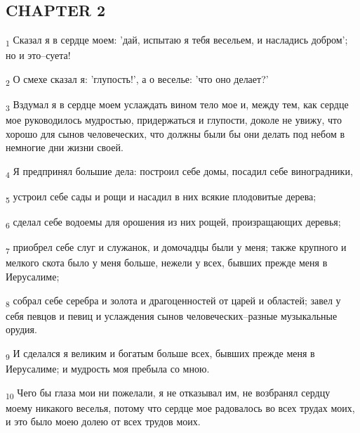 \subsection{CHAPTER 2}
\begin{tcolorbox}
\textsubscript{1} Сказал я в сердце моем: 'дай, испытаю я тебя весельем, и насладись добром'; но и это--суета!
\end{tcolorbox}
\begin{tcolorbox}
\textsubscript{2} О смехе сказал я: 'глупость!', а о веселье: 'что оно делает?'
\end{tcolorbox}
\begin{tcolorbox}
\textsubscript{3} Вздумал я в сердце моем услаждать вином тело мое и, между тем, как сердце мое руководилось мудростью, придержаться и глупости, доколе не увижу, что хорошо для сынов человеческих, что должны были бы они делать под небом в немногие дни жизни своей.
\end{tcolorbox}
\begin{tcolorbox}
\textsubscript{4} Я предпринял большие дела: построил себе домы, посадил себе виноградники,
\end{tcolorbox}
\begin{tcolorbox}
\textsubscript{5} устроил себе сады и рощи и насадил в них всякие плодовитые дерева;
\end{tcolorbox}
\begin{tcolorbox}
\textsubscript{6} сделал себе водоемы для орошения из них рощей, произращающих деревья;
\end{tcolorbox}
\begin{tcolorbox}
\textsubscript{7} приобрел себе слуг и служанок, и домочадцы были у меня; также крупного и мелкого скота было у меня больше, нежели у всех, бывших прежде меня в Иерусалиме;
\end{tcolorbox}
\begin{tcolorbox}
\textsubscript{8} собрал себе серебра и золота и драгоценностей от царей и областей; завел у себя певцов и певиц и услаждения сынов человеческих--разные музыкальные орудия.
\end{tcolorbox}
\begin{tcolorbox}
\textsubscript{9} И сделался я великим и богатым больше всех, бывших прежде меня в Иерусалиме; и мудрость моя пребыла со мною.
\end{tcolorbox}
\begin{tcolorbox}
\textsubscript{10} Чего бы глаза мои ни пожелали, я не отказывал им, не возбранял сердцу моему никакого веселья, потому что сердце мое радовалось во всех трудах моих, и это было моею долею от всех трудов моих.
\end{tcolorbox}
